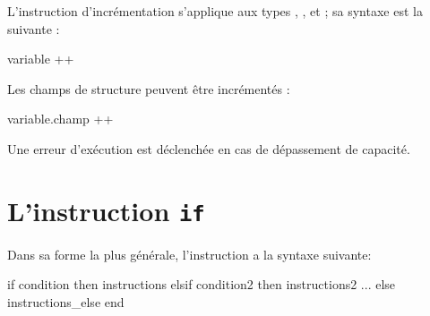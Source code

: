 {%
%
%
%





L'instruction d'incrémentation s'applique aux types  ,  ,  et  ; sa syntaxe est la suivante :
\begin{galgascode}
variable ++
\end{galgascode}

Les champs de structure peuvent être incrémentés :
\begin{galgascode}
variable.champ ++
\end{galgascode}

Une erreur d'exécution est déclenchée en cas de dépassement de capacité.









\section{L'instruction \texttt{if}}


Dans sa forme la plus générale, l'instruction  a la syntaxe suivante:
{
\begin{galgascode}
if condition then
  instructions
elsif condition2 then
  instructions2
...
else
  instructions_else
end
\end{galgascode}
}

}
